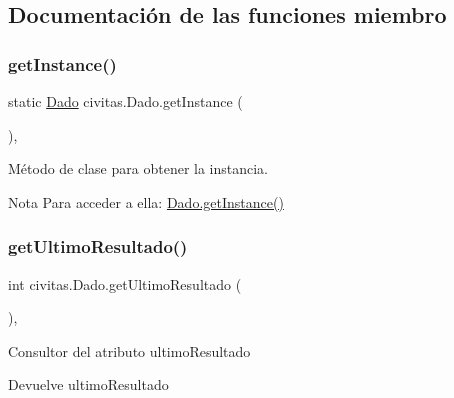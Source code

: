 \subsection{Documentación de las funciones miembro}
\mbox{\label{classcivitas_1_1Dado_a09462f46d46e9555b8cc92ba6a3adc92}} 
\subsubsection{\texorpdfstring{get\+Instance()}{getInstance()}}
{\footnotesize\ttfamily static \hyperlink{classcivitas_1_1Dado}{Dado} civitas.\+Dado.\+get\+Instance (\begin{DoxyParamCaption}{ }\end{DoxyParamCaption})\hspace{0.3cm}{\ttfamily [inline]}, {\ttfamily [static]}}

Método de clase para obtener la instancia. \begin{DoxyNote}{Nota}
Para acceder a ella\+: \hyperlink{classcivitas_1_1Dado_a09462f46d46e9555b8cc92ba6a3adc92}{Dado.\+get\+Instance()} 
\end{DoxyNote}
\mbox{\label{classcivitas_1_1Dado_a7ed26455a30faedfff9878177cf72861}} 
\subsubsection{\texorpdfstring{get\+Ultimo\+Resultado()}{getUltimoResultado()}}
{\footnotesize\ttfamily int civitas.\+Dado.\+get\+Ultimo\+Resultado (\begin{DoxyParamCaption}{ }\end{DoxyParamCaption})\hspace{0.3cm}{\ttfamily [inline]}, {\ttfamily [package]}}

Consultor del atributo ultimo\+Resultado \begin{DoxyReturn}{Devuelve}
ultimo\+Resultado 
\end{DoxyReturn}
\mbox{\label{classcivitas_1_1Dado_afac7574436f47c7a4d5f019b5a43c5bf}} 
